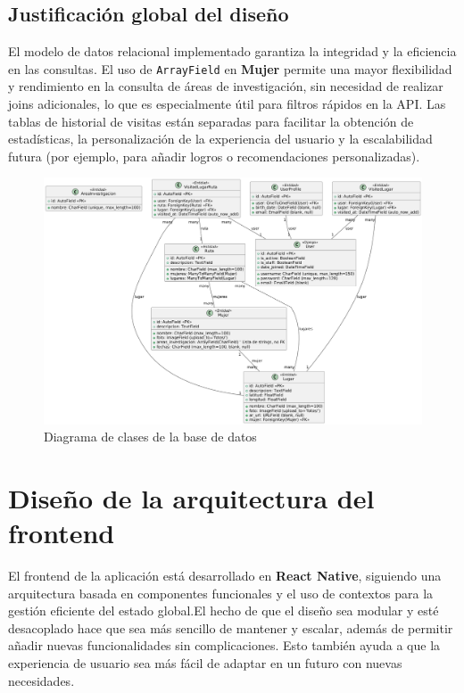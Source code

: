 \subsection{Justificación global del diseño}

El modelo de datos relacional implementado garantiza la integridad y la eficiencia en las consultas. El uso de \texttt{ArrayField} en \textbf{Mujer} permite una mayor flexibilidad y rendimiento en la consulta de áreas de investigación, sin necesidad de realizar joins adicionales, lo que es especialmente útil para filtros rápidos en la API. Las tablas de historial de visitas están separadas para facilitar la obtención de estadísticas, la personalización de la experiencia del usuario y la escalabilidad futura (por ejemplo, para añadir logros o recomendaciones personalizadas).
\begin{landscape}
    \begin{figure}
        \centering
        \includegraphics[width=1.2\paperwidth]{figs/diagrama_clases.png}
        \caption{Diagrama de clases de la base de datos}
    \end{figure}
\end{landscape}
\section{Diseño de la arquitectura del frontend}

El frontend de la aplicación está desarrollado en \textbf{React Native}, siguiendo una arquitectura basada en componentes funcionales y el uso de contextos para la gestión eficiente del estado global.El hecho de que el diseño sea modular y esté desacoplado hace que sea más sencillo de mantener y escalar, además de permitir añadir nuevas funcionalidades sin complicaciones. Esto también ayuda a que la experiencia de usuario sea más fácil de adaptar en un futuro con nuevas necesidades.

